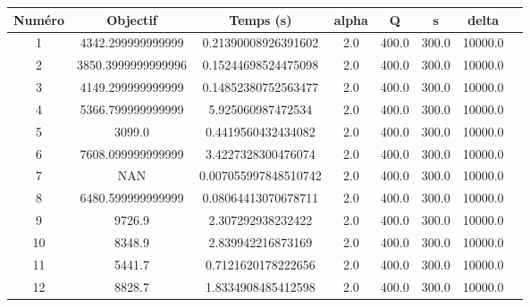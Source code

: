 \begin{tabular}{|c|c|c|c|c|c|c|c|}
\hline
 Numéro & Objectif & Temps (s) & alpha & Q & s & delta \\
\hline
1 & 4342.299999999999 & 0.21390008926391602 & 2.0 & 400.0 & 300.0 & 10000.0 \\ 
 \hline
2 & 3850.3999999999996 & 0.15244698524475098 & 2.0 & 400.0 & 300.0 & 10000.0 \\ 
 \hline
3 & 4149.299999999999 & 0.14852380752563477 & 2.0 & 400.0 & 300.0 & 10000.0 \\ 
 \hline
4 & 5366.799999999999 & 5.925060987472534 & 2.0 & 400.0 & 300.0 & 10000.0 \\ 
 \hline
5 & 3099.0 & 0.4419560432434082 & 2.0 & 400.0 & 300.0 & 10000.0 \\ 
 \hline
6 & 7608.099999999999 & 3.4227328300476074 & 2.0 & 400.0 & 300.0 & 10000.0 \\ 
 \hline
7 & NAN & 0.007055997848510742 & 2.0 & 400.0 & 300.0 & 10000.0 \\ 
 \hline
8 & 6480.599999999999 & 0.08064413070678711 & 2.0 & 400.0 & 300.0 & 10000.0 \\ 
 \hline
9 & 9726.9 & 2.307292938232422 & 2.0 & 400.0 & 300.0 & 10000.0 \\ 
 \hline
10 & 8348.9 & 2.839942216873169 & 2.0 & 400.0 & 300.0 & 10000.0 \\ 
 \hline
11 & 5441.7 & 0.7121620178222656 & 2.0 & 400.0 & 300.0 & 10000.0 \\ 
 \hline
12 & 8828.7 & 1.8334908485412598 & 2.0 & 400.0 & 300.0 & 10000.0 \\ 
 \hline
\end{tabular}
